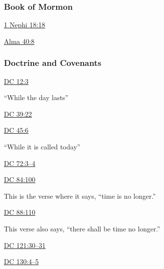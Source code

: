 	\subsubsection{Book of Mormon} %
		\label{TIME-BOM}
	
		
		\begin{compactdesc}
			\item[{\hyperref[1NEPHI-18-18]{1 Nephi 18:18}}]
			\item[{\hyperref[ALMA-40-8]{Alma 40:8}}]
		\end{compactdesc}
		
	\subsubsection{Doctrine and Covenants} %
		\label{TIME-DC}
	
		
		\begin{compactdesc}
			\item[{\hyperref[DC12-3]{DC 12:3}}] \phantom{.}
				\begin{compactitem}
					\item ``While the day lasts''
				\end{compactitem}
			\item[{\hyperref[DC39-22]{DC 39:22}}]
			\item[{\hyperref[DC45-6]{DC 45:6}}] \phantom{.}
				\begin{compactitem}
					\item ``While it is called today''
				\end{compactitem}
			\item[{\hyperref[DC72-3]{DC 72:3--4}}]
			\item[{\hyperref[DC84-100]{DC 84:100}}] \phantom{.}
				\begin{compactitem}
					\item This is the verse where it says, ``time is no longer.''
				\end{compactitem}
			\item[{\hyperref[DC88-110]{DC 88:110}}] \phantom{.}
				\begin{compactitem}
					\item This verse also says, ``there shall be time no longer.''
				\end{compactitem}
			\item[{\hyperref[DC121-30]{DC 121:30--31}}]
			\item[{\hyperref[DC130-4]{DC 130:4--5}}]
		\end{compactdesc}
		
